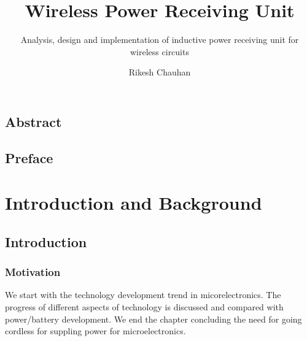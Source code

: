 \documentclass[UKenglish]{ifimaster}  %
\title{Wireless Power Receiving Unit}
\subtitle{Analysis, design and implementation of inductive power receiving unit for wireless circuits}
\author{Rikesh Chauhan}
\begin{document}
\ififorside{}
\frontmatter{}
\maketitle{}

\chapter*{Abstract}

\chapter*{Preface}

\cleardoublepage
{}
{}
\tableofcontents{}

\cleardoublepage
{}
{}
\listoffigures{}

\cleardoublepage
{}
{}
\listoftables{}
                  
\mainmatter{}



\part{Introduction and Background}

\chapter{Introduction}

\section{Motivation}

We start with the technology development trend in micorelectronics. The progress of different aspects of 
technology is discussed and compared with power/battery development. We end the chapter concluding the need for
going cordless for suppling power for microelectronics.
\end{document}
